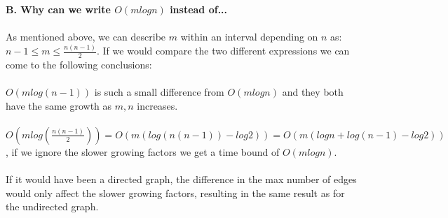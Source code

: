 \documentclass[12pt,oneside,reqno]{amsart}
\begin{document}
\textbf{B. Why can we write $O(m log n)$ instead of...}\\\\
As mentioned above, we can describe $m$ within an interval depending on $n$ as: $n-1 \leq m \leq \frac{n(n-1)}{2}$. If we would compare the two different expressions we can come to the following conclusions:\\\\
$O(mlog(n-1))$ is such a small difference from $O(mlogn)$ and they both have the same growth as $m,n$ increases.\\\\
$O(mlog(\frac{n(n-1)}{2}))=O(m(log(n(n-1))-log2))=O(m(logn+log(n-1)-log2))$, if we ignore the slower growing factors we get a time bound of $O(mlogn)$. \\\\
If it would have been a directed graph, the difference in the max number of edges would only affect the slower growing factors, resulting in the same result as for the undirected graph.\\\\
\end{document}
